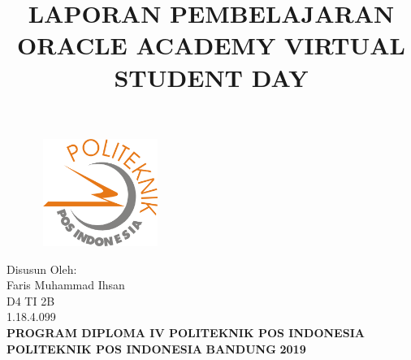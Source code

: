 \documentclass[a4paper, 12pt]{article}
\begin{document}
\title{\textbf{LAPORAN PEMBELAJARAN ORACLE ACADEMY VIRTUAL STUDENT DAY }}
\date{}

\maketitle

\begin{figure}[!ht]
\begin{center}
\includegraphics[width = 4cm, height = 3.5cm]{gambar/logo.png}
\end{center}
\end{figure}

\begin{center}
\vspace{1cm}
Disusun Oleh:\\
Faris Muhammad Ihsan\\
D4 TI 2B\\
1.18.4.099\\
\vspace{1cm}
\textbf{PROGRAM DIPLOMA IV POLITEKNIK POS INDONESIA} \linebreak
\textbf{POLITEKNIK POS INDONESIA} \linebreak
\textbf{BANDUNG}\linebreak
\textbf{2019}

\end{center}

\thispagestyle{empty}


\end{document}
